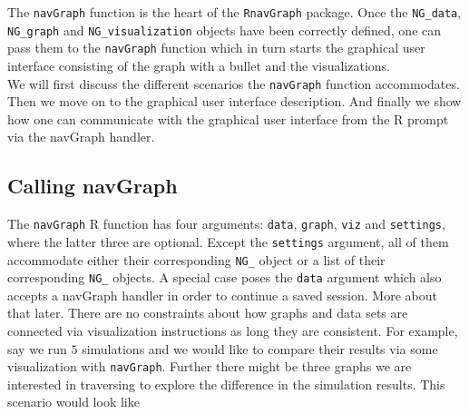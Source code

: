 \documentclass[12pt,oneside,titlepage,letter]{article}
\begin{document}
\newcommand{\ww}{4}
\newcommand{\wh}{4}

\newcommand{\mouse}[4]{
  \begin{scope}[shift={#1}]
    \filldraw[fill=white, draw = black, line width=1pt] (0,0) -- (-90:0.45) -- (-75:0.35) -- (-70:0.5) -- (-57:0.5) -- (-55:0.35) -- (-40:0.45) -- cycle; 
    \ifthenelse{\equal{#2}{}}{}{\node at #3 [#4, fill=red!30, line width = 1pt, draw = red!50!black, rounded corners] {#2};}
  \end{scope}
}



The \texttt{navGraph} function is the heart of the \texttt{RnavGraph} package. Once the \texttt{NG\_data}, \texttt{NG\_graph} and \texttt{NG\_visualization} objects have been correctly defined, one can pass them to the \texttt{navGraph} function which in turn starts the graphical user interface consisting of the graph with a bullet and the visualizations.\\

We will first discuss the different scenarios the \texttt{navGraph} function accommodates. Then we move on to the graphical user interface description. And finally we show how one can communicate with the graphical user interface from the R prompt via the navGraph handler.

\subsection{Calling navGraph}
The \texttt{navGraph} R function has four arguments: \texttt{data}, \texttt{graph}, \texttt{viz} and \texttt{settings}, where the latter three are optional. Except the \texttt{settings} argument, all of them accommodate either their corresponding \texttt{NG\_} object or a list of their corresponding \texttt{NG\_} objects. A special case poses the \texttt{data} argument which also accepts a navGraph handler in order to continue a saved session. More about that later. There are no constraints about how graphs and data sets are connected via visualization instructions as long they are consistent. For example, say we run $5$ simulations and we would like to compare their results via some visualization with \texttt{navGraph}. Further there might be three graphs we are interested in traversing to explore the difference in the simulation results. This scenario would look like
\end{document}
